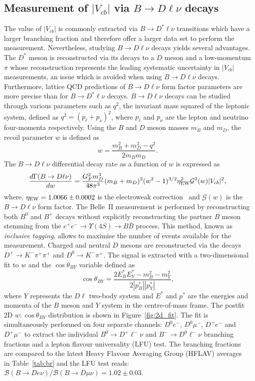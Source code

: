 \documentclass{moriond}
\def\vcb{V_{cb}}
\def\btodlnu{B \to D\ell\nu}
\def\btodstlnu{B \to D^*\ell\nu}
\def\costby{\cos\theta_{BY}}
\begin{document}
\subsection{Measurement of $|\vcb|$ via $\btodlnu$ decays}
The value of $|\vcb|$ is commonly extracted via $\btodstlnu$ transitions which have a larger branching fraction and therefore offer a larger data set to perform the measurement. Nevertheless, studying $\btodlnu$ decays yields several advantages. The $D^*$ meson is reconstructed via its decays to a $D$ meson and a low-momentum $\pi$ whose reconstruction represents the leading systematic uncertainty in $|\vcb|$ measurements, an issue which is avoided when using $\btodlnu$ decays. Furthermore, lattice QCD predictions of $\btodlnu$ form factor parameters are more precise than for $\btodstlnu$ decays. $\btodlnu$ decays can be studied through various parameters such as $q^2$, the invariant mass squared of the leptonic system, defined as $q^2 = (p_\ell + p_\nu)^2$, where $p_\ell$ and $p_\nu$ are the lepton and neutrino four-momenta respectively. Using the $B$ and $D$ meson masses $m_B$ and $m_D$, the recoil parameter $w$ is defined as
\begin{equation}
    w = \frac{m_B^2 + m_D^2 - q^2}{2m_Bm_D}.
\end{equation}
The $\btodlnu$ differential decay rate as a function of $w$ is expressed as~\cite{hqs}
\begin{equation}
    \frac{d\Gamma(\btodlnu)}{dw} = \frac{G_F^2m_D^3}{48\pi^3} (m_B+m_D)^2(w^2-1)^{3/2}\eta_{\rm EW}^2\mathcal{G}^2(w)|\vcb|^2,
\end{equation}
where, $\eta_{\rm EW} = 1.0066 \pm 0.0002$ is the electroweak correction~\cite{etaew} and $\mathcal{G}(w)$ is the $\btodlnu$ form factor. The Belle~II measurement is performed by reconstructing both $B^0$ and $B^+$ decays without explicitly reconstructing the partner $B$ meson stemming from the $e^+e^- \to \Upsilon(4S) \to B\bar{B}$ process. This method, known as \textit{inclusive tagging}, allows to maximise the number of events available for the measurement. Charged and neutral $D$ mesons are reconstructed via the decays $D^+ \to K^- \pi^+ \pi^+$ and $D^0 \to K^- \pi^+$. The signal is extracted with a two-dimensional fit to $w$ and the $\costby$ variable defined as
\begin{equation}\label{equ:costby}
    \costby = \frac{2E^*_BE^*_Y-m_B^2-m_Y^2}{2|p_B^*||p_Y^*|},
\end{equation}
where $Y$ represents the $D\ell$ two-body system and $E^*$ and $p^*$ are the energies and momenta of the $B$ meson and $Y$ system in the centre-of-mass frame. The postfit 2D $w:\costby$ distribution is shown in Figure~\ref{fig:2d_fit}. The fit is simultaneously performed on four separate channels: $D^0e^-$, $D^0\mu^-$, $D^+e^-$ and $D^+\mu^-$ to extract the individual $B^0 \to D^+\ell^-\nu$ and $B^- \to D^0\ell^-\nu$ branching fractions and a lepton flavour universality (LFU) test. The branching fractions are compared to the latest Heavy Flavour Averaging Group (HFLAV) averages~\cite{hflav} in Table~\ref{tab:br} and the LFU test reads: $\mathcal{B}(B \to D e \nu) / \mathcal{B}(B \to D \mu \nu) = 1.02 \pm 0.03$.
\end{document}
